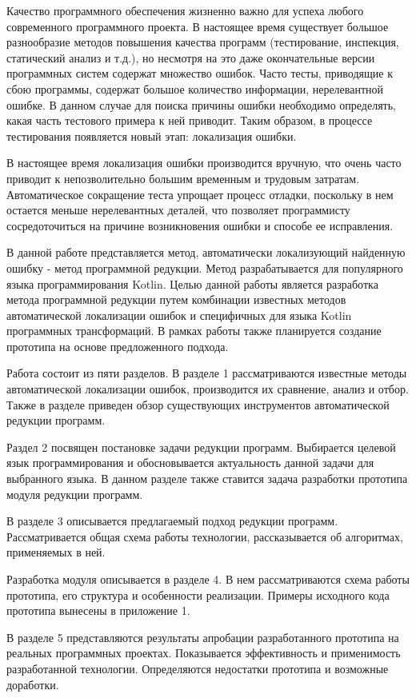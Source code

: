 \intro
Качество программного обеспечения жизненно важно для успеха любого современного программного проекта. В настоящее время существует большое разнообразие методов повышения качества программ (тестирование, инспекция, статический анализ и т.д.), но несмотря на это даже окончательные версии программных систем содержат множество ошибок. Часто тесты, приводящие к сбою программы, содержат большое количество информации, нерелевантной ошибке. В данном случае для поиска причины ошибки необходимо определять, какая часть тестового примера к ней приводит. Таким образом, в процессе тестирования появляется новый этап: локализация ошибки. 

В настоящее время локализация ошибки производится вручную, что очень часто приводит к непозволительно большим временным и трудовым затратам. Автоматическое сокращение теста упрощает процесс отладки, поскольку в нем остается меньше нерелевантных деталей, что позволяет программисту сосредоточиться на причине возникновения ошибки и способе ее исправления.

В данной работе представляется метод, автоматически локализующий найденную ошибку - метод программной редукции. Метод разрабатывается для популярного~\cite{tiobe2018tiobe} языка программирования Kotlin. Целью данной работы является разработка метода программной редукции путем комбинации известных методов автоматической локализации ошибок и специфичных для языка Kotlin программных трансформаций. В рамках работы также планируется создание прототипа на основе предложенного подхода.

Работа состоит из пяти разделов. В разделе 1 рассматриваются известные методы автоматической локализации ошибок, производится их сравнение, анализ и отбор. Также в разделе приведен обзор существующих инструментов автоматической редукции программ.

Раздел 2 посвящен постановке задачи редукции программ. Выбирается целевой язык программирования и обосновывается актуальность данной задачи для выбранного языка. В данном разделе также ставится задача разработки прототипа модуля редукции программ.

В разделе 3 описывается предлагаемый подход редукции программ. Рассматривается общая схема работы технологии, рассказывается об алгоритмах, применяемых в ней.


Разработка модуля описывается в разделе 4. В нем рассматри­ваются схема работы прототипа, его структура и особенности реализации. Примеры исходного кода прототипа вынесены в приложение 1.

В разделе 5 представляются результаты апробации разработан­ного прототипа на реальных программных проектах. Показывается эффективность и применимость разработанной технологии. Определяются недостатки прототипа и возможные доработки. 
